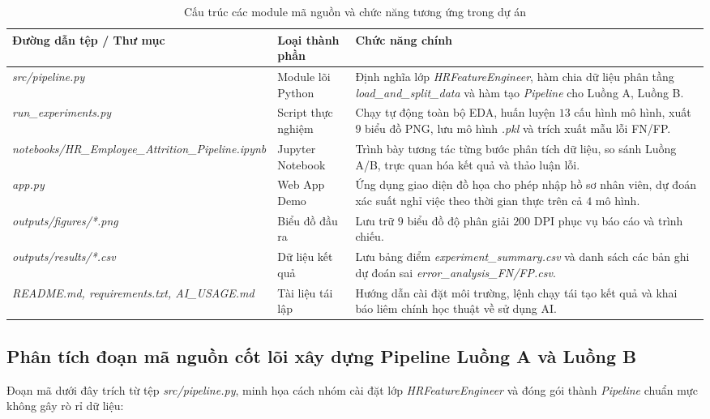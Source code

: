 \begin{table}[H]
\caption{Cấu trúc các module mã nguồn và chức năng tương ứng trong dự án}
\label{tab:cau-truc-ma-nguon}
\noindent
\begin{tabularx}{\textwidth}{|L{4.2cm}|L{3.1cm}|Y|}
\hline
\textbf{Đường dẫn tệp / Thư mục} & \textbf{Loại thành phần} & \textbf{Chức năng chính} \\
\hline
\textit{src/pipeline.py} & Module lõi Python & Định nghĩa lớp \textit{HRFeatureEngineer}, hàm chia dữ liệu phân tầng \textit{load\_and\_split\_data} và hàm tạo \textit{Pipeline} cho Luồng A, Luồng B. \\
\hline
\textit{run\_experiments.py} & Script thực nghiệm & Chạy tự động toàn bộ EDA, huấn luyện $13$ cấu hình mô hình, xuất $9$ biểu đồ PNG, lưu mô hình \textit{.pkl} và trích xuất mẫu lỗi FN/FP. \\
\hline
\textit{notebooks/HR\_Employee\_\allowbreak Attrition\_Pipeline.ipynb} & Jupyter Notebook & Trình bày tương tác từng bước phân tích dữ liệu, so sánh Luồng A/B, trực quan hóa kết quả và thảo luận lỗi. \\
\hline
\textit{app.py} & Web App Demo & Ứng dụng giao diện đồ họa cho phép nhập hồ sơ nhân viên, dự đoán xác suất nghỉ việc theo thời gian thực trên cả $4$ mô hình. \\
\hline
\textit{outputs/figures/*.png} & Biểu đồ đầu ra & Lưu trữ $9$ biểu đồ độ phân giải $200$ DPI phục vụ báo cáo và trình chiếu. \\
\hline
\textit{outputs/results/*.csv} & Dữ liệu kết quả & Lưu bảng điểm \textit{experiment\_summary.csv} và danh sách các bản ghi dự đoán sai \textit{error\_analysis\_FN/FP.csv}. \\
\hline
\textit{README.md, requirements.txt, AI\_USAGE.md} & Tài liệu tái lập & Hướng dẫn cài đặt môi trường, lệnh chạy tái tạo kết quả và khai báo liêm chính học thuật về sử dụng AI. \\
\hline
\end{tabularx}
\end{table}

\subsection{Phân tích đoạn mã nguồn cốt lõi xây dựng Pipeline Luồng A và Luồng B}
Đoạn mã dưới đây trích từ tệp \textit{src/pipeline.py}, minh họa cách nhóm cài đặt lớp \textit{HRFeatureEngineer} và đóng gói thành \textit{Pipeline} chuẩn mực không gây rò rỉ dữ liệu:

